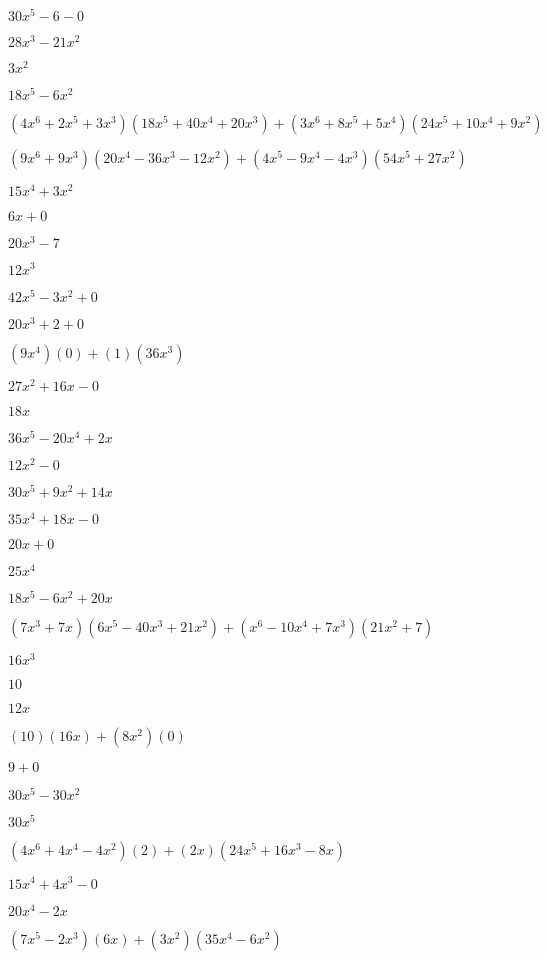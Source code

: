 \documentclass{article}
\begin{document}
\begin{multicols}{2}
$30x^{5}-6-0$\item $28x^{3}-21x^{2}$\item $3x^{2}$\item $18x^{5}-6x^{2}$\item $(4x^{6}+2x^{5}+3x^{3})(18x^{5}+40x^{4}+20x^{3})+(3x^{6}+8x^{5}+5x^{4})(24x^{5}+10x^{4}+9x^{2})$\item $(9x^{6}+9x^{3})(20x^{4}-36x^{3}-12x^{2})+(4x^{5}-9x^{4}-4x^{3})(54x^{5}+27x^{2})$\item $15x^{4}+3x^{2}$\item $6x+0$\item $20x^{3}-7$\item $12x^{3}$\item $42x^{5}-3x^{2}+0$\item $20x^{3}+2+0$\item $(9x^{4})(0)+(1)(36x^{3})$\item $27x^{2}+16x-0$\item $18x$\item $36x^{5}-20x^{4}+2x$\item $12x^{2}-0$\item $30x^{5}+9x^{2}+14x$\item $35x^{4}+18x-0$\item $20x+0$\item $25x^{4}$\item $18x^{5}-6x^{2}+20x$\item $(7x^{3}+7x)(6x^{5}-40x^{3}+21x^{2})+(x^{6}-10x^{4}+7x^{3})(21x^{2}+7)$\item $16x^{3}$\item $10$\item $12x$\item $(10)(16x)+(8x^2)(0)$\item $9+0$\item $30x^{5}-30x^{2}$\item $30x^{5}$\item $(4x^{6}+4x^{4}-4x^2)(2)+(2x)(24x^{5}+16x^{3}-8x)$\item $15x^{4}+4x^{3}-0$\item $20x^{4}-2x$\item $(7x^{5}-2x^{3})(6x)+(3x^2)(35x^{4}-6x^{2})$\item 
\end{multicols}
\end{document}
